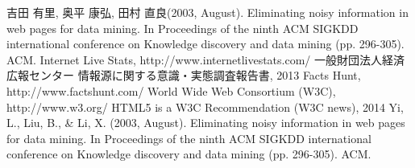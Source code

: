 \begin{thebibliography}{99}
 吉田 有里, 奥平 康弘, 田村 直良(2003, August). Eliminating noisy information in web pages for data mining. In Proceedings of the ninth ACM SIGKDD international conference on Knowledge discovery and data mining (pp. 296-305). ACM.
 Internet Live Stats, http://www.internetlivestats.com/
 一般財団法人経済広報センター 情報源に関する意識・実態調査報告書, 2013
 Facts Hunt, http://www.factshunt.com/
 World Wide Web Consortium (W3C), http://www.w3.org/
 HTML5 is a W3C Recommendation (W3C news), 2014
 Yi, L., Liu, B., \& Li, X. (2003, August). Eliminating noisy information in web pages for data mining. In Proceedings of the ninth ACM SIGKDD international conference on Knowledge discovery and data mining (pp. 296-305). ACM.
\end{thebibliography}


